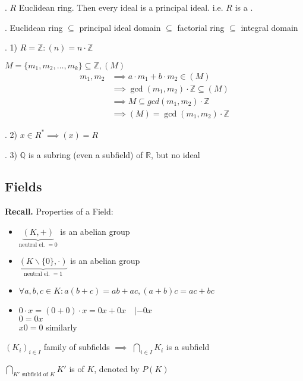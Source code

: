 \Theorem.
$R$ Euclidean ring. Then every ideal is a principal ideal.
i.e. $R$ is a .

\Remark.
Euclidean ring $\subseteq$ principal ideal domain $\subseteq$ factorial ring $\subseteq$ integral domain

\Example.
1) $R=\mathbb{Z}: (n) = n\cdot \mathbb{Z}$

$M = \{m_1, m_2, \ldots, m_k\} \subseteq \mathbb{Z}, (M)$\\
\begin{align*}
  m_1, m_2 &\implies a \cdot m_1 + b\cdot m_2 \in (M) \\
           &\implies \gcd(m_1,m_2) \cdot \mathbb{Z} \subseteq (M) \\
           &\implies M \subseteq gcd(m_1,m_2) \cdot \mathbb{Z} \\
           &\implies (M) = \gcd(m_1,m_2) \cdot \mathbb{Z}
\end{align*}

\Example.
2) $x\in R^{*} \implies (x) = R$

\Example.
3) $\mathbb{Q}$ is a subring (even a subfield) of $\mathbb{R}$, but no ideal

\subsection{Fields}

\textbf{Recall.} Properties of a Field:
\begin{itemize}
  \item $\underbrace{(K,+)}_{\text{neutral el. }= 0}$ is an abelian group

  \item  $\underbrace{(K\backslash \{0\}, \cdot)}_{\text{neutral el. }= 1}$ is an abelian group

  \item $\forall a,b,c \in K: a(b+c) = ab+ac, (a+b)c = ac+bc$

  \item $0\cdot x = (0+0) \cdot x = 0x + 0x \quad | -0x$\\
        $0 = 0x$\\
        $x0 = 0$ similarly
\end{itemize}

$(K_i)_{i\in I}$ family of subfields $\implies$ $\bigcap_{i\in I} K_i$ is a subfield

\begin{definition}
  $\displaystyle{\bigcap_{K' \text{ subfield of $K$}} K'}$ is  of $K$, denoted by $P(K)$
\end{definition}

